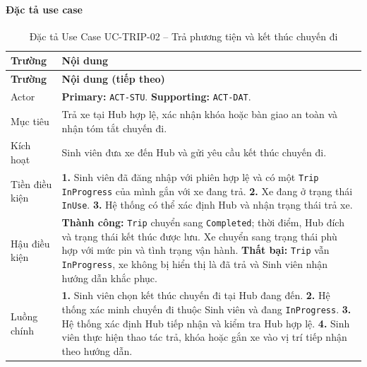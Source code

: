 \paragraph{Đặc tả use case}
\small
\begin{longtable}{|L{26mm}|L{118mm}|}
  \caption{Đặc tả Use Case UC-TRIP-02 -- Trả phương tiện và kết thúc chuyến đi}\label{tab:spec-UC-TRIP-02}\\
  \hline
  \centering\arraybackslash\textbf{Trường} & \centering\arraybackslash\textbf{Nội dung}\\
  \hline
  \endfirsthead
  \hline
  \centering\arraybackslash\textbf{Trường} & \centering\arraybackslash\textbf{Nội dung (tiếp theo)}\\
  \hline
  \endhead
  Actor & \textbf{Primary:} \texttt{ACT-STU}. \textbf{Supporting:} \texttt{ACT-DAT}.\\\hline
  Mục tiêu & Trả xe tại Hub hợp lệ, xác nhận khóa hoặc bàn giao an toàn và nhận tóm tắt chuyến đi.\\\hline
  Kích hoạt & Sinh viên đưa xe đến Hub và gửi yêu cầu kết thúc chuyến đi.\\\hline
  Tiền điều kiện &
    \textbf{1.} Sinh viên đã đăng nhập với phiên hợp lệ và có một \texttt{Trip} \texttt{InProgress} của mình gắn với xe đang trả.\newline
    \textbf{2.} Xe đang ở trạng thái \texttt{InUse}.\newline
    \textbf{3.} Hệ thống có thể xác định Hub và nhận trạng thái trả xe.\\\hline
  Hậu điều kiện &
    \textbf{Thành công:} \texttt{Trip} chuyển sang \texttt{Completed}; thời điểm, Hub đích và trạng thái kết thúc được lưu. Xe chuyển sang trạng thái phù hợp với mức pin và tình trạng vận hành.\newline
    \textbf{Thất bại:} \texttt{Trip} vẫn \texttt{InProgress}, xe không bị hiển thị là đã trả và Sinh viên nhận hướng dẫn khắc phục.\\\hline
  Luồng chính &
    \textbf{1.} Sinh viên chọn kết thúc chuyến đi tại Hub đang đến.\newline
    \textbf{2.} Hệ thống xác minh chuyến đi thuộc Sinh viên và đang \texttt{InProgress}.\newline
    \textbf{3.} Hệ thống xác định Hub tiếp nhận và kiểm tra Hub hợp lệ.\newline
    \textbf{4.} Sinh viên thực hiện thao tác trả, khóa hoặc gắn xe vào vị trí tiếp nhận theo hướng dẫn.\newline

\end{longtable}
